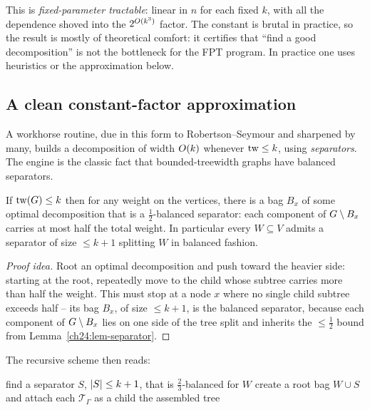 This is \emph{fixed-parameter tractable}: linear in $n$ for each fixed $k$, with
all the dependence shoved into the $2^{O(k^3)}$ factor. The constant is brutal
in practice, so the result is mostly of theoretical comfort: it certifies that
``find a good decomposition'' is not the bottleneck for the FPT program. In
practice one uses heuristics or the approximation below.

\subsection{A clean constant-factor approximation}

A workhorse routine, due in this form to Robertson--Seymour and sharpened by many,
builds a decomposition of width $O(k)$ whenever $\operatorname{tw}\le k$, using
\emph{separators}. The engine is the classic fact that bounded-treewidth graphs
have balanced separators.

\begin{lemma}
\label{ch24:lem-balanced-sep}
If $\operatorname{tw}(G)\le k$ then for any weight on the vertices, there is a bag $B_x$ of
some optimal decomposition that is a $\tfrac12$-balanced separator: each component
of $G\setminus B_x$ carries at most half the total weight. In particular every
$W\subseteq V$ admits a separator of size $\le k+1$ splitting $W$ in balanced
fashion.
\end{lemma}

\begin{proof}[Proof idea]
Root an optimal decomposition and push toward the heavier side: starting at the
root, repeatedly move to the child whose subtree carries more than half the
weight. This must stop at a node $x$ where no single child subtree exceeds half --
its bag $B_x$, of size $\le k+1$, is the balanced separator, because each
component of $G\setminus B_x$ lies on one side of the tree split and inherits
the $\le\tfrac12$ bound from Lemma~\ref{ch24:lem-separator}.
\end{proof}

The recursive scheme then reads:

\begin{algorithm}[H]
\caption{\textsc{ApproxDecompose}$(W)$ -- decomposition with boundary $W$}
\label{ch24:alg-approx}
find a separator $S$, $\lvert S\rvert\le k+1$, that is $\tfrac{2}{3}$-balanced for $W$\;
create a root bag $W\cup S$ and attach each $\mathcal{T}_\Gamma$ as a child\;
\Return the assembled tree\;
\end{algorithm}

